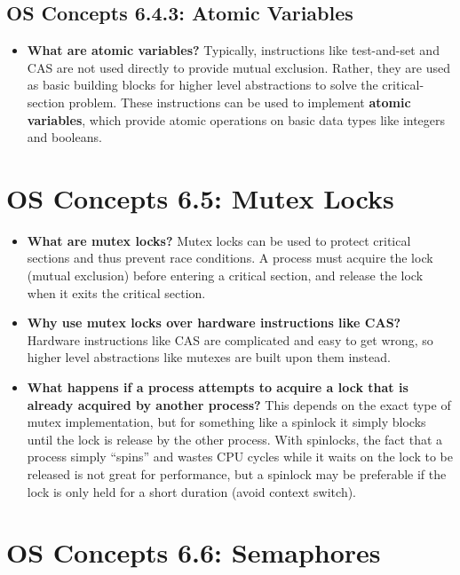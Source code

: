 \documentclass[12pt]{article}
\begin{document}
\subsection*{OS Concepts 6.4.3: Atomic Variables}

\begin{itemize}
    \item \textbf{What are atomic variables?} Typically, instructions like test-and-set and CAS are not used directly to provide mutual exclusion. Rather, they are used as basic building blocks for higher level abstractions to solve the critical-section problem. These instructions can be used to implement \textbf{atomic variables}, which provide atomic operations on basic data types like integers and booleans.
\end{itemize}

\section*{OS Concepts 6.5: Mutex Locks}

\begin{itemize}
    \item \textbf{What are mutex locks?} Mutex locks can be used to protect critical sections and thus prevent race conditions. A process must acquire the lock (mutual exclusion) before entering a critical section, and release the lock when it exits the critical section.
    \item \textbf{Why use mutex locks over hardware instructions like CAS?} Hardware instructions like CAS are complicated and easy to get wrong, so higher level abstractions like mutexes are built upon them instead.
    \item \textbf{What happens if a process attempts to acquire a lock that is already acquired by another process?} This depends on the exact type of mutex implementation, but for something like a spinlock it simply blocks until the lock is release by the other process. With spinlocks, the fact that a process simply ``spins'' and wastes CPU cycles while it waits on the lock to be released is not great for performance, but a spinlock may be preferable if the lock is only held for a short duration (avoid context switch).
\end{itemize}

\section*{OS Concepts 6.6: Semaphores}
\end{document}
